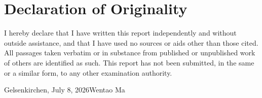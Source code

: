 \chapter*{Declaration of Originality}

I hereby declare that I have written this report independently and without
outside assistance, and that I have used no sources or aids other than those
cited. All passages taken verbatim or in substance from published or
unpublished work of others are identified as such. This report has not been
submitted, in the same or a similar form, to any other examination authority.

\vspace{3em}
\noindent Gelsenkirchen, July 8, 2026\hfill Wentao Ma
